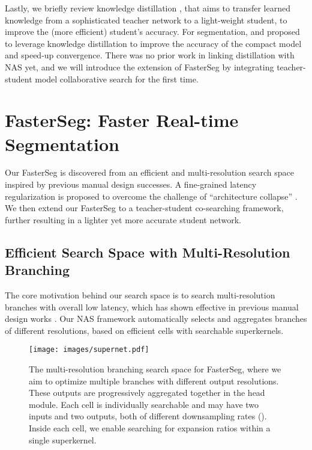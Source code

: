 \documentclass{article} \usepackage{iclr2020_conference,times}
\begin{document}
Lastly, we briefly review knowledge distillation \citep{hinton2015distilling}, that aims to transfer learned knowledge from a sophisticated teacher network to a light-weight student, to improve the (more efficient) student's accuracy. For segmentation, \citet{liu2019structured} and \citet{nekrasov2019fast} proposed to leverage knowledge distillation to improve the accuracy of the compact model and speed-up convergence. There was no prior work in linking distillation with NAS yet, and we will introduce the extension of FasterSeg by integrating teacher-student model collaborative search for the first time.\vspace{-0.5em}




\section{FasterSeg: Faster Real-time Segmentation}\vspace{-1em}

Our FasterSeg is discovered from an efficient and multi-resolution search space inspired by previous manual design successes. 
A fine-grained latency regularization is proposed to overcome the challenge of ``architecture collapse'' \citep{cheng2018instanas}. We then extend our FasterSeg to a teacher-student co-searching framework, further resulting in a lighter yet more accurate student network. \vspace{-1em}




\subsection{Efficient Search Space with Multi-Resolution Branching}\vspace{-0.5em}



The core motivation behind our search space is to search multi-resolution branches with overall low latency, which has shown effective in previous manual design works \citep{zhao2018icnet,yu2018bisenet}. Our NAS framework automatically selects and aggregates branches of different resolutions, based on efficient cells with searchable superkernels. \vspace{-1.3em}

\begin{figure}[ht]
\texttt{[image: images/supernet.pdf]}
\centering \vspace{-1em}
\caption{The multi-resolution branching search space for FasterSeg, where we aim to optimize multiple branches with different output resolutions. These outputs are progressively aggregated together in the head module. Each cell is individually searchable and may have two inputs and two outputs, both of different downsampling rates (). Inside each cell, we enable searching for expansion ratios within a single superkernel. 
}
\label{fig:supernet}
\end{figure}
\end{document}
